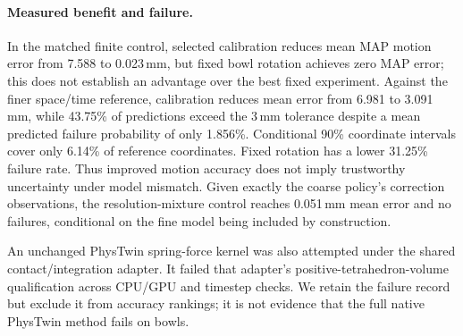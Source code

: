 \paragraph{Measured benefit and failure.}
In the matched finite control, selected calibration reduces mean MAP motion error
from 7.588 to 0.023\,mm, but fixed bowl rotation achieves zero MAP error; this does
not establish an advantage over the best fixed experiment. Against the finer
space/time reference, calibration reduces mean error from 6.981 to 3.091\,mm,
while 43.75\% of predictions exceed the 3\,mm tolerance despite a mean predicted
failure probability of only 1.856\%. Conditional 90\% coordinate intervals cover
only 6.14\% of reference coordinates. Fixed rotation has a lower 31.25\% failure
rate. Thus improved motion accuracy does not imply trustworthy uncertainty under
model mismatch. Given exactly the coarse policy's correction observations, the
resolution-mixture control reaches 0.051\,mm mean error and no failures, conditional
on the fine model being included by construction.









An unchanged PhysTwin spring-force kernel was also attempted under the shared
contact/integration adapter. It failed that adapter's positive-tetrahedron-volume
qualification across CPU/GPU and timestep checks. We retain the failure record but
exclude it from accuracy rankings; it is not evidence that the full native PhysTwin
method fails on bowls.
